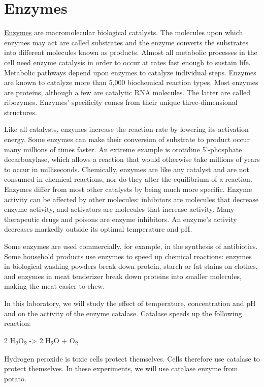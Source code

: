 \chapter{Enzymes}\label{enzymes}

\href{https://en.wikipedia.org/wiki/Enzyme}{Enzymes} are macromolecular
biological catalysts. The molecules upon which enzymes may act are
called substrates and the enzyme converts the substrates into different
molecules known as products. Almost all metabolic processes in the cell
need enzyme catalysis in order to occur at rates fast enough to sustain
life. Metabolic pathways depend upon enzymes to catalyze individual
steps. Enzymes are known to catalyze more than 5,000 biochemical
reaction types. Most enzymes are proteins, although a few are catalytic
RNA molecules. The latter are called ribozymes. Enzymes' specificity
comes from their unique three-dimensional structures.

Like all catalysts, enzymes increase the reaction rate by lowering its
activation energy. Some enzymes can make their conversion of substrate
to product occur many millions of times faster. An extreme example is
orotidine 5'-phosphate decarboxylase, which allows a reaction that would
otherwise take millions of years to occur in milliseconds. Chemically,
enzymes are like any catalyst and are not consumed in chemical
reactions, nor do they alter the equilibrium of a reaction. Enzymes
differ from most other catalysts by being much more specific. Enzyme
activity can be affected by other molecules: inhibitors are molecules
that decrease enzyme activity, and activators are molecules that
increase activity. Many therapeutic drugs and poisons are enzyme
inhibitors. An enzyme's activity decreases markedly outside its optimal
temperature and pH.

Some enzymes are used commercially, for example, in the synthesis of
antibiotics. Some household products use enzymes to speed up chemical
reactions: enzymes in biological washing powders break down protein,
starch or fat stains on clothes, and enzymes in meat tenderizer break
down proteins into smaller molecules, making the meat easier to chew.

In this laboratory, we will study the effect of temperature,
concentration and pH and on the activity of the enzyme catalase.
Catalase speeds up the following reaction:

2 H\textsubscript{2}O\textsubscript{2} -\textgreater{} 2
H\textsubscript{2}O + O\textsubscript{2}

Hydrogen peroxide is toxic cells protect themselves. Cells therefore use
catalase to protect themselves. In these experiments, we will use
catalase enzyme from potato.

